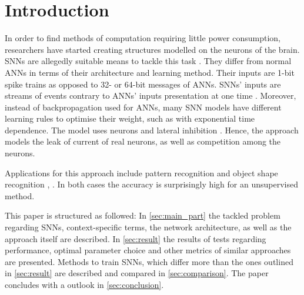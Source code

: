 \section{Introduction}

In order to find methods of computation requiring little power consumption, 
researchers have started creating structures modelled on the neurons of the brain.
\acp{SNN} are allegedly suitable means to tackle this task \cite{SNN}.
They differ from normal \acp{ANN} in terms of their architecture and learning method.
Their inputs are 1-bit spike trains as opposed to 32- or 64-bit messages of \acp{ANN}.
\acp{SNN}' inputs are streams of events contrary to \acp{ANN}' inputs presentation at one time \cite{ANN_SNN_conversion}.
Moreover, instead of backpropagation used for \acp{ANN}, many \ac{SNN} models have different learning rules to optimise their weight, 
such as  with exponential time dependence.
The model uses  neurons and lateral inhibition \cite{SNN}.
Hence, the approach models the leak of current of real neurons, as well as competition among the neurons.

Applications for this approach include pattern recognition \cite{SNN} and object shape recognition \cite{object_detection_SNN}, \cite{multi_scale_STDP}.
In both cases the accuracy is surprisingly high for an unsupervised method.

This paper is structured as followed:
In \autoref{sec:main_part} the tackled problem regarding \acp{SNN}, context-specific terms, the network architecture,
 as well as the approach itself are described.
In \autoref{sec:result} the results of tests regarding performance, optimal parameter choice and other metrics of similar approaches are presented.
Methods to train \acp{SNN}, which differ more than the ones outlined in \autoref{sec:result} are described and compared in \autoref{sec:comparison}.
The paper concludes with a outlook in \autoref{sec:conclusion}.
